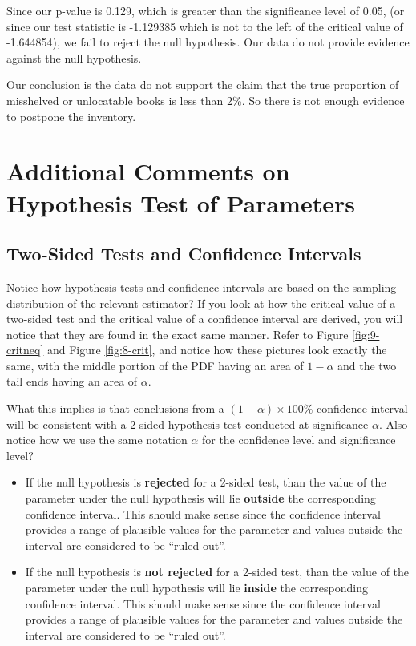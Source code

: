 \documentclass[
]{book}
\begin{document}
Since our p-value is 0.129, which is greater than the significance level of 0.05, (or since our test statistic is -1.129385 which is not to the left of the critical value of -1.644854), we fail to reject the null hypothesis. Our data do not provide evidence against the null hypothesis.

Our conclusion is the data do not support the claim that the true proportion of misshelved or unlocatable books is less than 2\%. So there is not enough evidence to postpone the inventory.

\hypertarget{infcomments}{%
\section{Additional Comments on Hypothesis Test of Parameters}\label{infcomments}}

\hypertarget{inference}{%
\subsection{Two-Sided Tests and Confidence Intervals}\label{inference}}

Notice how hypothesis tests and confidence intervals are based on the sampling distribution of the relevant estimator? If you look at how the critical value of a two-sided test and the critical value of a confidence interval are derived, you will notice that they are found in the exact same manner. Refer to Figure \ref{fig:9-critneq} and Figure \ref{fig:8-crit}, and notice how these pictures look exactly the same, with the middle portion of the PDF having an area of \(1-\alpha\) and the two tail ends having an area of \(\alpha\).

What this implies is that conclusions from a \((1-\alpha) \times 100\%\) confidence interval will be consistent with a 2-sided hypothesis test conducted at significance \(\alpha\). Also notice how we use the same notation \(\alpha\) for the confidence level and significance level?

\begin{itemize}
\item
  If the null hypothesis is \textbf{rejected} for a 2-sided test, than the value of the parameter under the null hypothesis will lie \textbf{outside} the corresponding confidence interval. This should make sense since the confidence interval provides a range of plausible values for the parameter and values outside the interval are considered to be ``ruled out''.
\item
  If the null hypothesis is \textbf{not rejected} for a 2-sided test, than the value of the parameter under the null hypothesis will lie \textbf{inside} the corresponding confidence interval. This should make sense since the confidence interval provides a range of plausible values for the parameter and values outside the interval are considered to be ``ruled out''.
\end{itemize}
\end{document}
